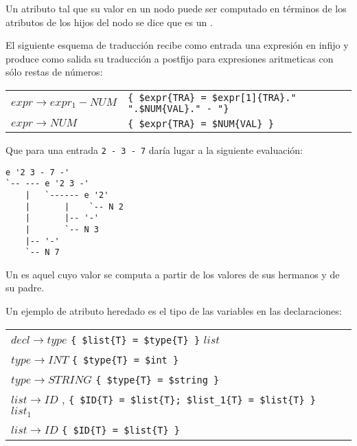 \begin{definition}
Un atributo tal que su valor en un nodo
puede ser computado en términos de los atributos de los hijos del nodo se dice
que es un .
\end{definition}

El siguiente esquema de traducción recibe como entrada una expresión en infijo
y produce como salida su traducción a postfijo para expresiones aritmeticas con sólo 
restas de números:

\vspace{0.5cm}
\begin{tabular}{ll}
$expr   \rightarrow expr_1  -  NUM$  & \verb|{ $expr{TRA} = $expr[1]{TRA}." ".$NUM{VAL}." - "}| \\
$expr   \rightarrow NUM$             & \verb|{ $expr{TRA} = $NUM{VAL} }|
\end{tabular}
\vspace{0.5cm}

Que para una entrada \verb|2 - 3 - 7| daría lugar a la siguiente evaluación:

\begin{verbatim}
e '2 3 - 7 -'
`-- --- e '2 3 -'
    |   `------ e '2'
    |       |    `-- N 2
    |       |-- '-'
    |       `-- N 3
    |-- '-'
    `-- N 7
\end{verbatim}


\begin{definition}
Un  es aquel cuyo valor se computa a partir de los
valores de sus hermanos y de su padre.
\end{definition}

\begin{example}
\label{example:eyapptypesandts}
Un ejemplo de atributo heredado es el tipo de las variables en las declaraciones:

\vspace{0.5cm}
\begin{tabular}{ll}
$decl   \rightarrow type$ \verb|{ $list{T} = $type{T} }| $list$\\
$type   \rightarrow INT$ \verb|{ $type{T} = $int }|\\
$type   \rightarrow STRING$ \verb|{ $type{T} = $string }|\\
$list   \rightarrow ID$ , \verb|{ $ID{T} = $list{T}; $list_1{T} = $list{T} }| $list_1$\\
$list   \rightarrow ID$ \verb|{ $ID{T} = $list{T} }|
\end{tabular}
\vspace{0.5cm}
\end{example}


